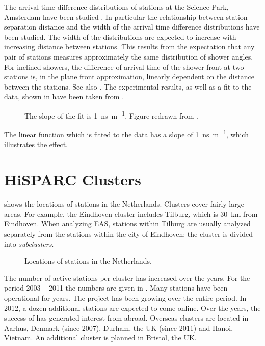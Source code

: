 The arrival time difference distributions of \hisparc stations at the
Science Park, Amsterdam have been studied \cite{Bosboom:2011}.  In
particular the relationship between station separation distance and the
width of the arrival time difference distributions have been studied.  The
width of the distributions are expected to increase with increasing
distance between stations.  This results from the expectation that any
pair of stations measures approximately the same distribution of shower
angles.  For inclined showers, the difference of arrival time of the
shower front at two stations is, in the plane front approximation,
linearly dependent on the distance between the stations.  See also
.  The experimental results, as well as a
fit to the data, shown in
 have been taken from
\cite{Bosboom:2011}.
%
\begin{figure}
\centering

\caption{  The slope of the fit is
\SI{1}{\nano\second\per\meter}.  Figure redrawn from \cite{Bosboom:2011}.}
\label{fig:station-timing-distribution-vs-distance}
\end{figure}
%
The linear function which is fitted to the data has a slope of
\SI{1}{\nano\second\per\meter}, which illustrates the effect.


\section{HiSPARC Clusters}
\label{sec:hisparc-locations}

 shows the locations of \hisparc stations in the
Netherlands. Clusters cover fairly large areas.  For example, the Eindhoven
cluster includes Tilburg, which is \SI{30}{\kilo\meter} from Eindhoven.  When
analyzing EAS, stations within Tilburg are usually analyzed separately from the
stations within the city of Eindhoven: the cluster is divided into
\emph{subclusters}.

\begin{figure}
\centering

\caption{Locations of \hisparc stations in the Netherlands.}
\label{fig:hisparc-locations}
\end{figure}

The number of active stations per cluster has increased over the years. For the
period 2003 -- 2011 the numbers are given in .
Many stations have been operational for years. The project has been growing over
the entire period. In 2012, a dozen additional stations are expected to come
online. Over the years, the success of \hisparc has generated interest from
abroad.
Overseas clusters are located in Aarhus, Denmark (since 2007), Durham, the UK
(since 2011) and Hanoi, Vietnam. An additional cluster is planned in Bristol,
the UK.

